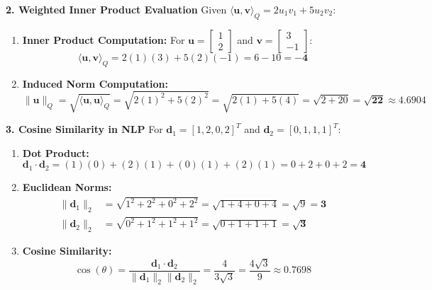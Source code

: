 \textbf{2. Weighted Inner Product Evaluation}
Given $\langle \mathbf{u}, \mathbf{v} \rangle_Q = 2 u_1 v_1 + 5 u_2 v_2$:
\begin{enumerate}
    \item \textbf{Inner Product Computation:}
    For $\mathbf{u} = \begin{bmatrix} 1 \\ 2 \end{bmatrix}$ and $\mathbf{v} = \begin{bmatrix} 3 \\ -1 \end{bmatrix}$:
    \begin{equation*}
    \langle \mathbf{u}, \mathbf{v} \rangle_Q = 2(1)(3) + 5(2)(-1) = 6 - 10 = \mathbf{-4}
    \end{equation*}
    \item \textbf{Induced Norm Computation:}
    \begin{equation*}
    \|\mathbf{u}\|_Q = \sqrt{\langle \mathbf{u}, \mathbf{u} \rangle_Q} = \sqrt{2(1)^2 + 5(2)^2} = \sqrt{2(1) + 5(4)} = \sqrt{2 + 20} = \mathbf{\sqrt{22} \approx 4.6904}
    \end{equation*}
\end{enumerate}

\textbf{3. Cosine Similarity in NLP}
For $\mathbf{d}_1 = [1, 2, 0, 2]^T$ and $\mathbf{d}_2 = [0, 1, 1, 1]^T$:
\begin{enumerate}
    \item \textbf{Dot Product:}
    \begin{equation*}
    \mathbf{d}_1 \cdot \mathbf{d}_2 = (1)(0) + (2)(1) + (0)(1) + (2)(1) = 0 + 2 + 0 + 2 = \mathbf{4}
    \end{equation*}
    \item \textbf{Euclidean Norms:}
    \begin{align*}
    \|\mathbf{d}_1\|_2 &= \sqrt{1^2 + 2^2 + 0^2 + 2^2} = \sqrt{1 + 4 + 0 + 4} = \sqrt{9} = \mathbf{3} \\
    \|\mathbf{d}_2\|_2 &= \sqrt{0^2 + 1^2 + 1^2 + 1^2} = \sqrt{0 + 1 + 1 + 1} = \mathbf{\sqrt{3}}
    \end{align*}
    \item \textbf{Cosine Similarity:}
    \begin{equation*}
    \cos(\theta) = \frac{\mathbf{d}_1 \cdot \mathbf{d}_2}{\|\mathbf{d}_1\|_2 \|\mathbf{d}_2\|_2} = \frac{4}{3\sqrt{3}} = \frac{4\sqrt{3}}{9} \approx \mathbf{0.7698}
    \end{equation*}
\end{enumerate}

